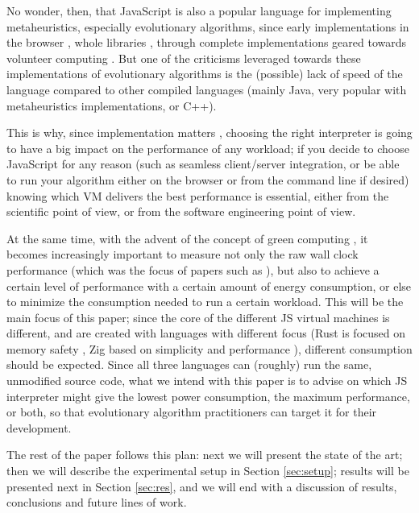 \documentclass[a4paper,twoside]{article}
\begin{document}
No wonder, then, that JavaScript is also a popular language for implementing
metaheuristics, especially evolutionary algorithms, since early implementations
in the browser \cite{smith1996ga,jesusIWANN99,langdon2004global}, whole
libraries \cite{EvoStar2014:jsEO}, through complete implementations geared
towards volunteer computing \cite{2016arXiv160101607M}. But one of the
criticisms leveraged towards these implementations of evolutionary algorithms
is the (possible) lack of speed of the language compared to other compiled
languages (mainly Java, very popular with metaheuristics implementations, or
C++).

This is why, since implementation matters \cite{DBLP:conf/iwann/MereloRACML11},
choosing the right interpreter is going to have a big impact on the performance
of any workload; if you decide to choose JavaScript for any reason (such as
seamless client/server integration, or be able to run your algorithm either on
the browser or from the command line if desired) knowing which VM delivers the
best performance is essential, either from the scientific point of view, or
from the software engineering point of view.

At the same time, with the advent of the concept of green computing
\cite{kurp2008green}, it becomes increasingly important to measure not only the
raw wall clock performance (which was the focus of papers such as
\cite{DBLP:conf/evoW/GuervosBCRGRVHR17}), but also to achieve a certain level
of performance with a certain amount of energy consumption, or else to minimize
the consumption needed to run a certain workload. This will be the main focus
of this paper; since the core of the different JS virtual machines is
different, and are created with languages with different focus (Rust is focused
on memory safety \cite{noseda2022rust}, Zig based on simplicity and performance
\cite{zig}), different consumption should be expected. Since all three
languages can (roughly) run the same, unmodified source code, what we intend
with this paper is to advise on which JS interpreter might give the lowest
power consumption, the maximum performance, or both, so that evolutionary
algorithm practitioners can target it for their development.

The rest of the paper follows this plan: next we will present the state of the
art; then we will describe the experimental setup in Section \ref{sec:setup};
results will be presented next in Section \ref{sec:res}, and we will end with a
discussion of results, conclusions and future lines of work.
\end{document}
